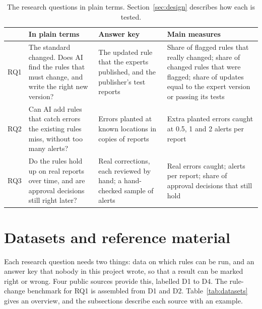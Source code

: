 \documentclass[11pt,a4paper]{article}
\let\oldsection\section
\renewcommand{\section}{\FloatBarrier\oldsection}
\begin{document}
\begin{table}[htb]
\centering
\small
\begin{tabularx}{\textwidth}{P{1.0cm} L L L}
\toprule
& In plain terms & Answer key & Main measures \\
\midrule
RQ1 & The standard changed. Does AI find the rules that must change, and write the right new version? & The updated rule that the experts published, and the publisher's test reports & Share of flagged rules that really changed; share of changed rules that were flagged; share of updates equal to the expert version or passing its tests \\
RQ2 & Can AI add rules that catch errors the existing rules miss, without too many alerts? & Errors planted at known locations in copies of reports & Extra planted errors caught at 0.5, 1 and 2 alerts per report \\
RQ3 & Do the rules hold up on real reports over time, and are approval decisions still right later? & Real corrections, each reviewed by hand; a hand-checked sample of alerts & Real errors caught; alerts per report; share of approval decisions that still hold \\
\bottomrule
\end{tabularx}
\caption{The research questions in plain terms. Section~\ref{sec:design} describes how each is tested.}
\label{tab:rqplain}
\end{table}

\section{Datasets and reference material}
\label{sec:data}

Each research question needs two things: data on which rules can be run, and an answer key that nobody in this project wrote, so that a result can be marked right or wrong. Four public sources provide this, labelled D1 to D4. The rule-change benchmark for RQ1 is assembled from D1 and D2. Table~\ref{tab:datasets} gives an overview, and the subsections describe each source with an example.
\end{document}
